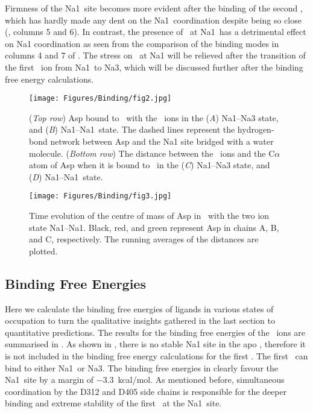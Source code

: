 Firmness of the Na1\prim\ site becomes more evident after the binding of the second \Na, which has 
hardly made any dent on the Na1\prim\ coordination despite being so close (, columns 
5 and 6). In contrast, the presence of \Na\ at Na1\prim\ has a detrimental effect on Na1 coordination as 
seen from the comparison of the binding modes in columns 4 and 7 of . The stress on 
\Na\ at Na1 will be relieved after the transition of the first \Na\ ion from Na1\prim\ to Na3, which 
will be discussed further after the binding free energy calculations.

\begin{figure}[t!]
\centering
\texttt{[image: Figures/Binding/fig2.jpg]}
\caption{(\textit{Top row}) Asp bound to \GltPh\ with the \Na\ ions in the (\textit{A})
         Na1--Na3 state, and (\textit{B}) Na1--Na1\prim\ state. The dashed lines 
         represent the hydrogen-bond network between Asp and the Na1 site bridged with 
         a water molecule. (\textit{Bottom row}) The distance between the \Na\ ions and 
         the C$\alpha$ atom of Asp when it is bound to \GltPh\ in the (\textit{C})
         Na1--Na3 state, and (\textit{D}) Na1--Na1\prim\ state.}
\label{bind:fig2}
\end{figure}

\begin{figure}[t!]
\centering
\texttt{[image: Figures/Binding/fig3.jpg]}
\caption{Time evolution of the centre of mass of Asp in \GltPh\ with the two 
ion state Na1--Na1\prim. Black, red, and green represent Asp in chains A, B, 
and C, respectively. The running averages of the distances are plotted.}
\label{bind:fig3}
\end{figure}

\subsection{Binding Free Energies}
Here we calculate the binding free energies of ligands in various states of occupation to turn 
the qualitative insights gathered in the last section to quantitative predictions.
The results for the binding free energies of the \Na\ ions are summarised in .
As shown in , there is no stable Na1 site in the apo \GltPh, therefore it is not 
included in the binding free energy calculations for the first \Na. The first \Na\ can bind to either 
Na1\prim\ or Na3. The binding free energies in  clearly favour the Na1\prim\ site 
by a margin of $-3.3$~kcal/mol. As mentioned before, simultaneous coordination by the D312 and D405 
side chains is responsible for the deeper binding and extreme stability of the first \Na\ at the 
Na1\prim\ site. 

